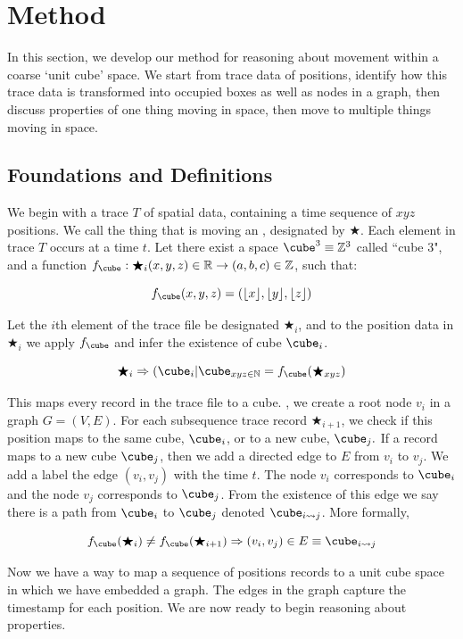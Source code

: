 \section{Method}
\label{sec:method}

In this section, we develop our method for reasoning about movement within a coarse `unit cube' space.
We start from trace data of positions, identify how this trace data is transformed into occupied boxes as well as nodes in a graph, then discuss properties of one thing moving in space, then move to multiple things moving in space.

\subsection{Foundations and Definitions}
We begin with a trace $T$ of spatial data, containing a time sequence of $xyz$ positions.
We call the thing that is moving an , designated by $\bigstar$.
Each element in trace $T$ occurs at a time $t$.
Let there exist a space $\cube^3 \equiv \mathbb{Z}^3$ called ``cube 3", and a function $f_{\cube}: \bigstar_i (x,y,z) \in \mathbb{R} \rightarrow (a,b,c) \in \mathbb{Z}$, such that:

$$f_{\cube}(x,y,z) = (\lfloor x \rfloor, \lfloor y \rfloor , \lfloor z \rfloor )$$

Let the $i$th element of the trace file be designated $\bigstar_i$, and to the position data in $\bigstar_i$ we apply $f_{\cube}$ and infer the existence of cube $\cube_i$.

$$\bigstar_i \Rightarrow (\cube_i | \cube_{xyz\in \mathbb{N}} = f_{\cube}(\bigstar_{xyz})$$ 

This maps every record in the trace file to a cube.
, we create a root node $v_i$ in a graph $G = (V,E)$.
For each subsequence trace record $\bigstar_{i+1}$, we check if this position maps to the same cube, $\cube_i$, or to a new cube, $\cube_{j}.$
If a record maps to a new cube $\cube_{j}$, then we add a directed edge to $E$ from $v_i$ to $v_{j}$.  
We add a label the edge $(v_i, v_j)$ with the time $t$.
The node $v_i$ corresponds to $\cube_i$ and the node $v_{j}$ corresponds to $\cube_{j}$.
From the existence of this edge we say there is a path from $\cube_i$ to $\cube_j$ denoted $\cube_{i\rightsquigarrow j}$.  More formally,

$$ f_{\cube}(\bigstar_i) \neq f_{\cube}(\bigstar_{i+1}) \Rightarrow (v_i, v_j) \in E \equiv \cube_{i\rightsquigarrow j} $$


Now we have a way to map a sequence of positions records to a unit cube space in which we have embedded a graph.
The edges in the graph capture the timestamp for each position.
We are now ready to begin reasoning about properties.

